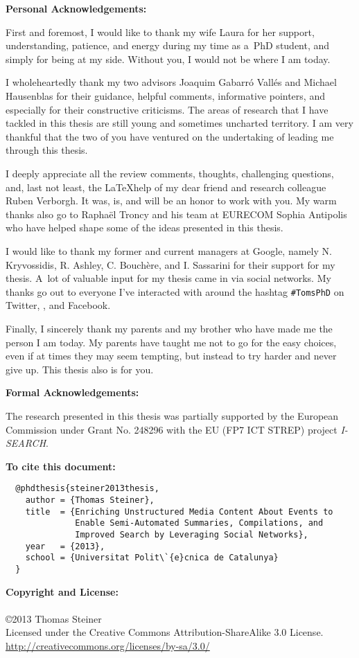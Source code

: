 \begin{acknowledgements}

\textbf{Personal Acknowledgements:}

First and foremost, I would like to thank my wife Laura
for her support, understanding, patience, and energy
during my time as a~PhD student, and simply for being at my side.
Without you, I would not be where I am today.

I wholeheartedly thank my two advisors Joaquim Gabarró Vallés
and Michael Hausenblas for their guidance, helpful comments,
informative pointers, and especially
for their constructive criticisms.
The areas of research that I have tackled in this thesis
are still young and sometimes uncharted territory.
I am very thankful that the two of you have ventured
on the undertaking of leading me through this thesis.

I deeply appreciate all the review comments, thoughts, challenging questions,
and, last not least, the \LaTeX help of my dear friend
and research colleague Ruben Verborgh.
It was, is, and will be an honor to work with you.
My warm thanks also go to Raphaël Troncy and his team
at EURECOM Sophia Antipolis
who have helped shape some of the ideas presented in this thesis.

I would like to thank my former and current managers at Google,
namely N. Kryvossidis, R. Ashley, C. Bouchère, and I. Sassarini
for their support for my thesis.
A~lot of valuable input for my thesis came in via social networks.
My thanks go out to everyone I've interacted with
around the hashtag \texttt{\#TomsPhD}
on Twitter, \googleplus, and Facebook.

Finally, I sincerely thank my parents and my brother
who have made me the person I am today.
My parents have taught me
not to go for the easy choices, even
if at times they may seem tempting,
but instead to try harder and never give up.
This thesis also is for you.

\textbf{Formal Acknowledgements:}

The research presented in this thesis
was partially supported by the European Commission
under Grant No. 248296 with the EU (FP7 ICT STREP)
project \mbox{\emph{I-SEARCH}}.

\vspace{80mm}

\textbf{To cite this document:}

\small
\begin{verbatim}
  @phdthesis{steiner2013thesis,
    author = {Thomas Steiner},
    title  = {Enriching Unstructured Media Content About Events to
              Enable Semi-Automated Summaries, Compilations, and
              Improved Search by Leveraging Social Networks},
    year   = {2013},
    school = {Universitat Polit\`{e}cnica de Catalunya}
  }
\end{verbatim}

\normalsize

\vspace{10mm}
\textbf{Copyright and License:}\\\\
\small \copyright \normalsize 2013 Thomas Steiner\\
Licensed under the Creative Commons Attribution-ShareAlike 3.0 License.\\
\url{http://creativecommons.org/licenses/by-sa/3.0/}

\end{acknowledgements}
